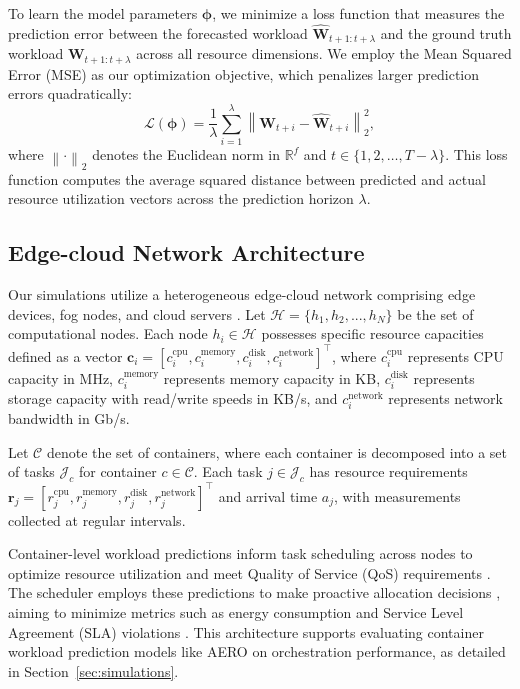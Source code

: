 \documentclass{ieeetmlcn}
\begin{document}
To learn the model parameters $\boldsymbol{\phi}$, we minimize a loss function that measures the prediction error between the forecasted workload $\hat{\mathbf{W}}_{t+1:t+\lambda}$ and the ground truth workload $\mathbf{W}_{t+1:t+\lambda}$ across all resource dimensions. We employ the Mean Squared Error (MSE) as our optimization objective, which penalizes larger prediction errors quadratically: 
\begin{equation}
\mathcal{L}(\boldsymbol{\phi}) = \frac{1}{\lambda} \sum_{i=1}^{\lambda} \left\| \mathbf{W}_{t+i} - \hat{\mathbf{W}}_{t+i} \right\|_2^2,
\end{equation}
where $\left\| \cdot \right\|_2$ denotes the Euclidean norm in $\mathbb{R}^f$ and $t \in \{1, 2, \ldots, T-\lambda\}$. This loss function computes the average squared distance between predicted and actual resource utilization vectors across the prediction horizon $\lambda$.

\subsection{Edge-cloud Network Architecture}

Our simulations utilize a heterogeneous edge-cloud network comprising edge devices, fog nodes, and cloud servers \cite{tuli2021cosco}. Let $\mathcal{H} = \{h_1, h_2, ..., h_N\}$ be the set of computational nodes. Each node $h_i \in \mathcal{H}$ possesses specific resource capacities defined as a vector $\mathbf{c}_i = [c_i^{\text{cpu}}, c_i^{\text{memory}}, c_i^{\text{disk}}, c_i^{\text{network}}]^\top$, where $c_i^{\text{cpu}}$ represents CPU capacity in MHz, $c_i^{\text{memory}}$ represents memory capacity in KB, $c_i^{\text{disk}}$ represents storage capacity with read/write speeds in KB/s, and $c_i^{\text{network}}$ represents network bandwidth in Gb/s.

Let $\mathcal{C}$ denote the set of containers, where each container is decomposed into a set of tasks $\mathcal{J}_c$ for container $c \in \mathcal{C}$. Each task $j \in \mathcal{J}_c$ has resource requirements $\mathbf{r}_j = [r_j^{\text{cpu}}, r_j^{\text{memory}}, r_j^{\text{disk}}, r_j^{\text{network}}]^\top$ and arrival time $a_j$, with measurements collected at regular intervals.

Container-level workload predictions inform task scheduling across nodes to optimize resource utilization and meet Quality of Service (QoS) requirements \cite{tuli2021cosco}. The scheduler employs these predictions to make proactive allocation decisions \cite{farhad2023ai}, aiming to minimize metrics such as energy consumption and Service Level Agreement (SLA) violations \cite{raith2024opportunistic}. This architecture supports evaluating container workload prediction models like AERO on orchestration performance, as detailed in Section~\ref{sec:simulations}.
\end{document}
